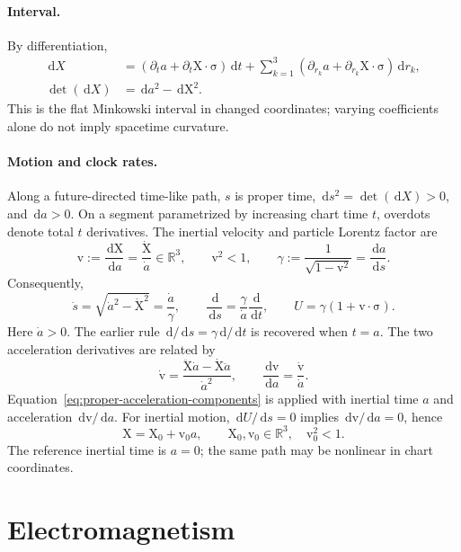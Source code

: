 \documentclass[11pt]{article}
\newcommand{\pv}[1]{{#1}}
\newcommand{\vstyle}[1]{{\bm{\mathrm{#1}}}}
\newcommand{\pU}{\pv{U}}
\newcommand{\pX}{\pv{X}}
\numberwithin{equation}{section}
\newcommand{\R}{\mathbb{R}}
\newcommand{\dotprod}{\cdot}
\newcommand{\bsig}{\vstyle{\sigma}}
\newcommand{\bX}{\vstyle{X}}
\newcommand{\bv}{\vstyle{v}}
\newcommand{\dd}{\,\mathrm d}
\begin{document}
\paragraph{Interval.}
By differentiation,
\begin{align*}
 \dd\pX&=(\partial_t a+\partial_t\bX\dotprod\bsig)\dd t
 +\sum_{k=1}^3(\partial_{r_k}a+\partial_{r_k}\bX\dotprod\bsig)\dd r_k,\\
 \det(\dd\pX)&=\dd a^2-\dd\bX^2.
\end{align*}
This is the flat Minkowski interval in changed coordinates; varying
coefficients alone do not imply spacetime curvature.

\paragraph{Motion and clock rates.}
Along a future-directed time-like path, $s$ is proper time,
$\dd s^2=\det(\dd\pX)>0$, and $\dd a>0$.
On a segment parametrized by increasing chart time $t$, overdots denote
total $t$ derivatives. The inertial velocity and particle Lorentz factor are
\[
 \bv:=\frac{\dd\bX}{\dd a}=\frac{\dot{\bX}}{\dot a}\in\R^3,
 \qquad \bv^2<1,\qquad
 \gamma:=\frac{1}{\sqrt{1-\bv^2}}=\frac{\dd a}{\dd s}.
\]
Consequently,
\begin{equation}
 \dot s=\sqrt{\dot a^2-\dot{\bX}^2}=\frac{\dot a}{\gamma},\qquad
 \frac{\dd}{\dd s}=\frac{\gamma}{\dot a}\frac{\dd}{\dd t},\qquad
 \pU=\gamma(1+\bv\dotprod\bsig).
 \label{eq:chart-clock-rate}
\end{equation}
Here $\dot a>0$. The earlier rule $\dd/\dd s=\gamma\dd/\dd t$ is
recovered when $t=a$. The two acceleration derivatives are related by
\[
 \dot{\bv}=\frac{\ddot{\bX}\dot a-\dot{\bX}\ddot a}{\dot a^2},
 \qquad \frac{\dd\bv}{\dd a}=\frac{\dot\bv}{\dot a}.
\]
Equation~\eqref{eq:proper-acceleration-components} is applied with inertial
time $a$ and acceleration $\dd\bv/\dd a$.
For inertial motion, $\dd\pU/\dd s=0$ implies $\dd\bv/\dd a=0$, hence
\[
 \bX=\bX_0+\bv_0 a,\qquad
 \bX_0,\bv_0\in\R^3,\quad \bv_0^2<1.
\]
The reference inertial time is $a=0$; the same path may be nonlinear in
chart coordinates.

\section{Electromagnetism}
\label{sec:electromagnetism}
\end{document}
